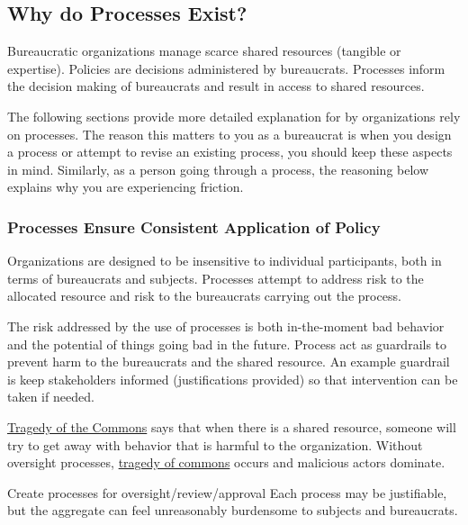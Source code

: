 \subsection{Why do Processes Exist?}

Bureaucratic organizations manage scarce shared resources (tangible or expertise). Policies are decisions administered by bureaucrats. Processes inform the decision making of bureaucrats and result in access to shared resources. 

The following sections provide more detailed explanation for by organizations rely on processes. The reason this matters to you as a bureaucrat is when you design a process or attempt to revise an existing process, you should keep these aspects in mind. Similarly, as a person going through a process, the reasoning below explains why you are experiencing friction. 

\subsubsection{Processes Ensure Consistent Application of Policy}

Organizations are designed to be insensitive to individual participants, both in terms of bureaucrats and subjects. Processes attempt to address risk to the allocated resource and risk to the bureaucrats carrying out the process.

The risk addressed by the use of processes is both in-the-moment bad behavior and the potential of things going bad in the future. Process act as guardrails to prevent harm to the bureaucrats and the shared resource. An example guardrail is keep stakeholders informed (justifications provided) so that intervention can be taken if needed. 

\href{https://en.wikipedia.org/wiki/Tragedy_of_the_commons}{Tragedy of the Commons} says that when there is a shared resource, someone will try to get away with behavior that is harmful to the organization.
Without oversight processes, \href{https://en.wikipedia.org/wiki/Tragedy_of_the_commons}{tragedy of commons} occurs and malicious actors dominate.


Create processes for oversight/review/approval
Each process may be justifiable, but the aggregate can feel unreasonably burdensome to subjects and bureaucrats.






